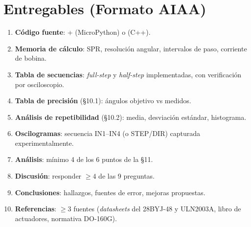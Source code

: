 \documentclass[11pt]{article}
\begin{document}
\section{Entregables (Formato AIAA)}
\begin{enumerate}
  \item \textbf{Código fuente}:  + 
        (MicroPython) o  (C++).
  \item \textbf{Memoria de cálculo}: SPR, resolución angular, intervalos de paso,
        corriente de bobina.
  \item \textbf{Tabla de secuencias}: \emph{full-step} y \emph{half-step} implementadas,
        con verificación por osciloscopio.
  \item \textbf{Tabla de precisión} (\S10.1): ángulos objetivo vs medidos.
  \item \textbf{Análisis de repetibilidad} (\S10.2): media, desviación estándar,
        histograma.
  \item \textbf{Oscilogramas}: secuencia IN1--IN4 (o STEP/DIR) capturada
        experimentalmente.
  \item \textbf{Análisis}: mínimo 4 de los 6 puntos de la \S11.
  \item \textbf{Discusión}: responder $\ge 4$ de las 9 preguntas.
  \item \textbf{Conclusiones}: hallazgos, fuentes de error, mejoras propuestas.
  \item \textbf{Referencias}: $\ge 3$ fuentes (\emph{datasheets} del 28BYJ-48 y ULN2003A,
        libro de actuadores, normativa DO-160G).
\end{enumerate}

\end{document}
